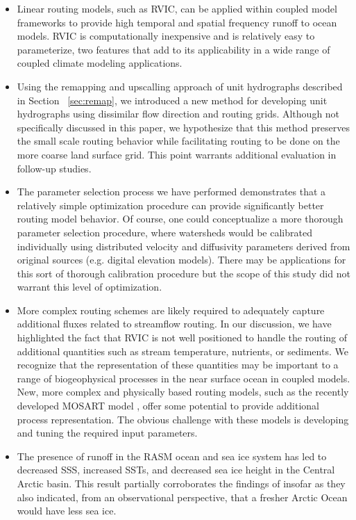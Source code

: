 \documentclass[jgrga, draft]{agutex}
\begin{document}
\begin{article}
\begin{itemize}
\item Linear routing models, such as RVIC, can be applied within coupled model frameworks to provide high temporal and spatial frequency runoff to ocean models.
RVIC is computationally inexpensive and is relatively easy to parameterize, two features that add to its applicability in a wide range of coupled climate modeling applications.
\item Using the remapping and upscalling approach of unit hydrographs described in Section ~\ref{sec:remap}, we introduced a new method for developing unit hydrographs using dissimilar flow direction and routing grids.
Although not specifically discussed in this paper, we hypothesize that this method preserves the small scale routing behavior while facilitating routing to be done on the more coarse land surface grid.
This point warrants additional evaluation in follow-up studies.
\item The parameter selection process we have performed demonstrates that a relatively simple optimization procedure can provide significantly better routing model behavior.
Of course, one could conceptualize a more thorough parameter selection procedure, where watersheds would be calibrated individually using distributed velocity and diffusivity parameters derived from original sources (e.g. digital elevation models).
There may be applications for this sort of thorough calibration procedure but the scope of this study did not warrant this level of optimization.
\item More complex routing schemes are likely required to adequately capture additional fluxes related to streamflow routing.
In our discussion, we have highlighted the fact that RVIC is not well positioned to handle the routing of additional quantities such as stream temperature, nutrients, or sediments.
We recognize that the representation of these quantities may be important to a range of biogeophysical processes in the near surface ocean in coupled models.
New, more complex and physically based routing models, such as the recently developed MOSART model \citep{Li_2013}, offer some potential to provide additional process representation.
The obvious challenge with these models is developing and tuning the required input parameters.
\item The presence of runoff in the RASM ocean and sea ice system has led to decreased SSS, increased SSTs, and decreased sea ice height in the Central Arctic basin.
This result partially corroborates the findings of \citep{Morison_2012} insofar as they also indicated, from an observational perspective, that a fresher Arctic Ocean would have less sea ice.


\end{itemize}
\end{article}
\end{document}
